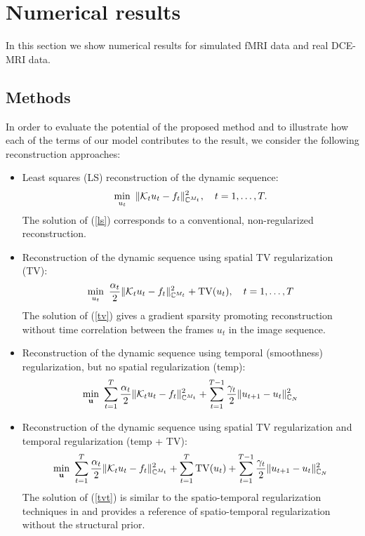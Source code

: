 \section{Numerical results}\label{sec:numerics}
In this section we show numerical results for simulated fMRI data and real DCE-MRI data. 

\subsection{Methods}
In order to evaluate the potential of the proposed method and to illustrate how each of the terms of our model contributes to the result, we consider the following reconstruction approaches:
\begin{itemize}
\item Least squares (LS) reconstruction of the dynamic sequence: 
\begin{alignat}{4} \label{ls}
\min_{u_t} ~  \| \mathcal{K}_t u_t - f_t \|_{\mathbb{C}^{M_t}}^2   
,\quad t= 1,\ldots,T.
\end{alignat}
The solution of (\ref{ls}) corresponds to a conventional, non-regularized reconstruction.

\item Reconstruction of the dynamic sequence using spatial TV regularization (TV):
\begin{alignat}{4} \label{tv}
\min_{u_t} ~ \frac{\alpha_t}{2} \| \mathcal{K}_t u_t - f_t \|_{\mathbb{C}^{M_t}}^2 + \mathrm{TV}(u_t)  
,\quad t= 1,\ldots,T
\end{alignat}
The solution of (\ref{tv}) gives a gradient sparsity promoting reconstruction without time correlation between the frames $u_t$ in the image sequence.

\item Reconstruction of the dynamic sequence using temporal (smoothness) regularization, but no spatial regularization (temp):
\begin{alignat}{4} \label{l2t}
\min_{\mathbf{u}} ~ \sum_{t=1}^T \frac{\alpha_t}{2} \| \mathcal{K}_t u_t - f_t \|_{\mathbb{C}^{M_t}}^2  + \sum_{t=1}^{T-1} \frac{\gamma_t}{2} \|u_{t+1} - u_t \|_{\mathbb{C}_N}^2 
\end{alignat}

\item Reconstruction of the dynamic sequence using spatial TV regularization and temporal regularization (temp + TV):
\begin{alignat}{4} \label{tvt}
\min_{\mathbf{u}} ~ \sum_{t=1}^T \frac{\alpha_t}{2} \| \mathcal{K}_t u_t - f_t \|_{\mathbb{C}^{M_t}}^2 + \sum_{t=1}^T \mathrm{TV}(u_t)  + \sum_{t=1}^{T-1} \frac{\gamma_t}{2} \|u_{t+1} - u_t \|_{\mathbb{C}_N}^2 
\end{alignat}
The solution of (\ref{tvt}) is similar to the spatio-temporal regularization techniques in \cite{adluru2009,wundrak2016} and provides a reference
of spatio-temporal regularization without the structural prior.


\end{itemize}
